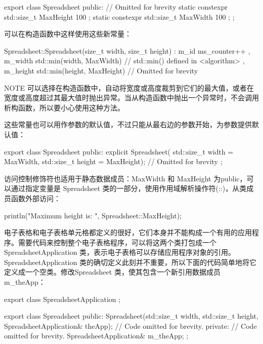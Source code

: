 \begin{cpp}
export class Spreadsheet
{
    public:
        // Omitted for brevity
        static constexpr std::size_t MaxHeight { 100 };
        static constexpr std::size_t MaxWidth { 100 };
};
\end{cpp}

可以在构造函数中这样使用这些新常量：

\begin{cpp}
Spreadsheet::Spreadsheet(size_t width, size_t height)
    : m_id { ms_counter++ }
    , m_width { std::min(width, MaxWidth) } // std::min() defined in <algorithm>
    , m_height { std::min(height, MaxHeight) }
{
    // Omitted for brevity
}
\end{cpp}

\begin{myNotic}{NOTE}
可以选择在构造函数中，自动将宽度或高度裁剪到它们的最大值，或者在宽度或高度超过其最大值时抛出异常。当从构造函数中抛出一个异常时，不会调用析构函数，所以要小心使用这种方法。
\end{myNotic}

这些常量也可以用作参数的默认值，不过只能从最右边的参数开始，为参数提供默认值：

\begin{cpp}
export class Spreadsheet
{
    public:
        explicit Spreadsheet(
            std::size_t width = MaxWidth, std::size_t height = MaxHeight);
        // Omitted for brevity
};
\end{cpp}


访问控制修饰符也适用于静态数据成员：MaxWidth 和 MaxHeight 为public，可以通过指定变量是 Spreadsheet 类的一部分，使用作用域解析操作符(::)，从类成员函数外部访问：

\begin{cpp}
println("Maximum height is: {}", Spreadsheet::MaxHeight);
\end{cpp}


电子表格和电子表格单元格都定义的很好，它们本身并不能构成一个有用的应用程序。需要代码来控制整个电子表格程序，可以将这两个类打包成一个 SpreadsheetApplication 类，表示电子表格可以存储应用程序对象的引用。SpreadsheetApplication 类的确切定义此刻并不重要，所以下面的代码简单地将它定义成一个空类。修改Spreadsheet 类，使其包含一个新引用数据成员 m\_theApp：

\begin{cpp}
export class SpreadsheetApplication { };

export class Spreadsheet
{
    public:
        Spreadsheet(std::size_t width, std::size_t height,
            SpreadsheetApplication& theApp);
        // Code omitted for brevity.
    private:
        // Code omitted for brevity.
        SpreadsheetApplication& m_theApp;
};
\end{cpp}

